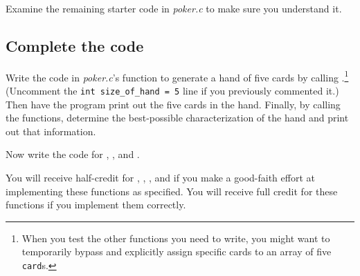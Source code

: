 Examine the remaining starter code in \textit{poker.c} to make sure you understand it.

\subsection{Complete the code} \label{subsec:completepoker}

Write the code in \textit{poker.c}'s  function to generate a hand of five cards by calling .\footnote{When you test the other functions you need to write, you might want to temporarily bypass  and explicitly assign specific cards to an array of five \lstinline{card}s.}
(Uncomment the \lstinline{int size_of_hand = 5} line if you previously commented it.)
Then have the program print out the five cards in the hand.
Finally, by calling the  functions, determine the best-possible characterization of the hand and print out that information.

Now write the code for , , and .

You will receive half-credit for , , , and  if you make a good-faith effort at implementing these functions as specified.
You will receive full credit for these functions if you implement them correctly.